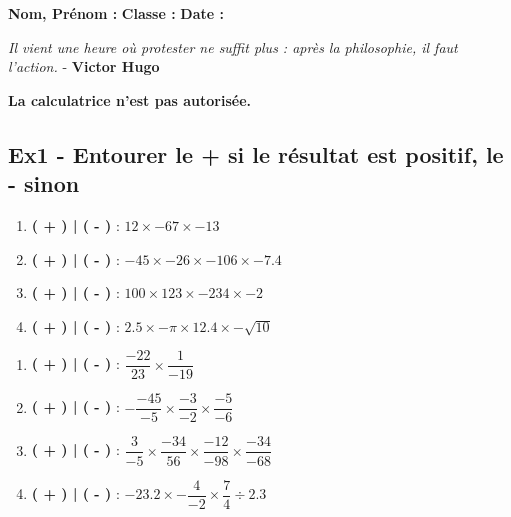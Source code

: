 \documentclass[12pt]{article}
\begin{document}

\textbf{Nom, Prénom :} \hspace{8cm} \textbf{Classe :} \hspace{3cm} \textbf{Date :}

\begin{center}
  \textit{Il vient une heure où protester ne suffit plus : après la philosophie, il faut l’action.}  - \textbf{Victor Hugo}

\end{center}

\textbf{La calculatrice n'est pas autorisée.}

\subsection*{Ex1 - Entourer le + si le résultat est positif, le - sinon}

\begin{multicols}{2}
  
  \begin{enumerate}
  \item[] \textbf{( + ) | ( - )} : $ 12 \times -67 \times -13$\\
  \item[] \textbf{( + ) | ( - )} : $ -45 \times -26 \times -106 \times -7.4$\\
  \item[] \textbf{( + ) | ( - )} : $ 100 \times 123 \times -234 \times -2$\\
  \item[] \textbf{( + ) | ( - )} : $ 2.5 \times -\pi \times 12.4 \times -\sqrt{10}$\\
  \end{enumerate}

  \begin{enumerate}
  \item[] \textbf{( + ) | ( - )} :  $ \dfrac{-22}{23} \times \dfrac{1}{-19} $ \\
  \item[] \textbf{( + ) | ( - )} :  $ - \dfrac{-45}{-5} \times \dfrac{-3}{-2} \times \dfrac{-5}{-6}$ \\
  \item[] \textbf{( + ) | ( - )} :  $ \dfrac{3}{-5} \times \dfrac{-34}{56} \times \dfrac{-12}{-98} \times  \dfrac{-34}{-68} $ \\
  \item[] \textbf{( + ) | ( - )} :  $ -23.2 \times -\dfrac{4}{-2} \times \dfrac{7}{4} \div 2.3$ \\
  \end{enumerate}

\end{multicols}
\end{document}
